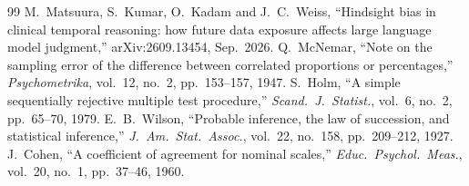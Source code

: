\IfFileExists{IEEEtran.cls}{\ieeetrue\documentclass[conference]{IEEEtran}}{\ieeefalse\documentclass[10pt,twocolumn,letterpaper]{article}}
\begin{document}
\begin{thebibliography}{99}
 M.~Matsuura, S.~Kumar, O.~Kadam and J.~C.~Weiss, ``Hindsight bias in clinical temporal reasoning: how future data exposure affects large language model judgment,'' arXiv:2609.13454, Sep.\ 2026.
 Q.~McNemar, ``Note on the sampling error of the difference between correlated proportions or percentages,'' \emph{Psychometrika}, vol.~12, no.~2, pp.~153--157, 1947.
 S.~Holm, ``A simple sequentially rejective multiple test procedure,'' \emph{Scand.\ J.\ Statist.}, vol.~6, no.~2, pp.~65--70, 1979.
 E.~B.~Wilson, ``Probable inference, the law of succession, and statistical inference,'' \emph{J.\ Am.\ Stat.\ Assoc.}, vol.~22, no.~158, pp.~209--212, 1927.
 J.~Cohen, ``A coefficient of agreement for nominal scales,'' \emph{Educ.\ Psychol.\ Meas.}, vol.~20, no.~1, pp.~37--46, 1960.
\end{thebibliography}
\end{document}
